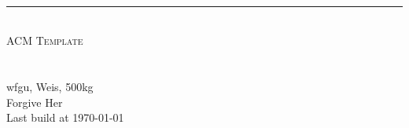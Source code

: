 \begin{titlepage}
	\pagestyle{empty}
	
	\begin{center}
		~\\[80pt]
		\hrule\ \\[8pt]
		\fontsize{48pt}{\baselineskip}\selectfont  \textsc{ACM Template}\\[8pt]
		~\\[20pt]
		~\\[20pt]
		\normalsize wfgu, Weis, 500kg \\
		\huge Forgive Her\\[8pt]
		\Large Last build at \today
	\end{center}
\end{titlepage}
\restoregeometry
